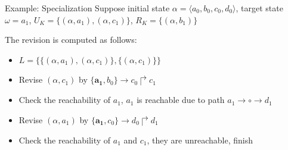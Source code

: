 \documentclass[8pt]{beamer}
\newcommand{\libcirc}[1]{\pgfmathparse{
    ifthenelse(#1 > 0 && #1 < 21, Hex(9311+#1), Hex(9450)
    }\libertineGlyph{uni\pgfmathresult}}
\begin{document}
\begin{frame}{Example: Specialization}
    Suppose initial state $\alpha=\langle a_0,b_0,c_0,d_0\rangle$, target state $\omega=a_1$, $U_K=\{(\alpha,a_1),(\alpha,c_1)\}$, $R_K=\{(\alpha,b_1)\}$
    \begin{figure}
        \centering
        
    \end{figure}
    The revision is computed as follows: 
    \begin{itemize}
        \item $L=\{\{(\alpha,a_1),(\alpha,c_1)\},\{(\alpha,c_1)\}\}$
        \item Revise $(\alpha,c_1)$ by $\{\mathbf{a_1}, b_0\}\to c_0\Rsh c_1$
        \item Check the reachability of $a_1$, $a_1$ is reachable due to path $a_1\to\circ\to d_1$
        \item Revise $(\alpha,a_1)$ by $\{\mathbf{a_1},c_0\}\to d_0\Rsh d_1$
        \item Check the reachability of $a_1$ and $c_1$, they are unreachable, finish
    \end{itemize}
    
\end{frame}
\end{document}
